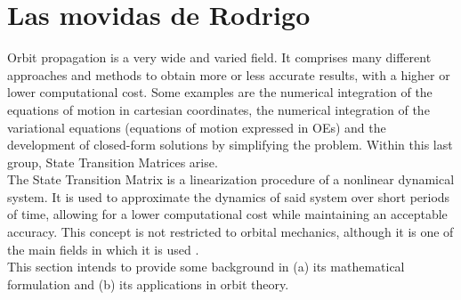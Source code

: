 \section{Las movidas de Rodrigo}
%
\indent Orbit propagation is a very wide and varied field. It comprises many different approaches and methods to obtain more or less accurate results, with a higher or lower computational cost. Some examples are the numerical integration of the equations of motion in cartesian coordinates, the numerical integration of the variational equations (\ie equations of motion expressed in OEs) and the development of closed-form solutions by simplifying the problem. Within this last group, State Transition Matrices arise.\\
%
\indent The State Transition Matrix is a linearization procedure of a nonlinear dynamical system. It is used to approximate the dynamics of said system over short periods of time, allowing for a lower computational cost while maintaining an acceptable accuracy. This concept is not restricted to orbital mechanics, although it is one of the main fields in which it is used \cite{Montenbruck}. \\
%
\indent This section intends to provide some background in (a) its mathematical formulation and (b) its applications in orbit theory.
%
